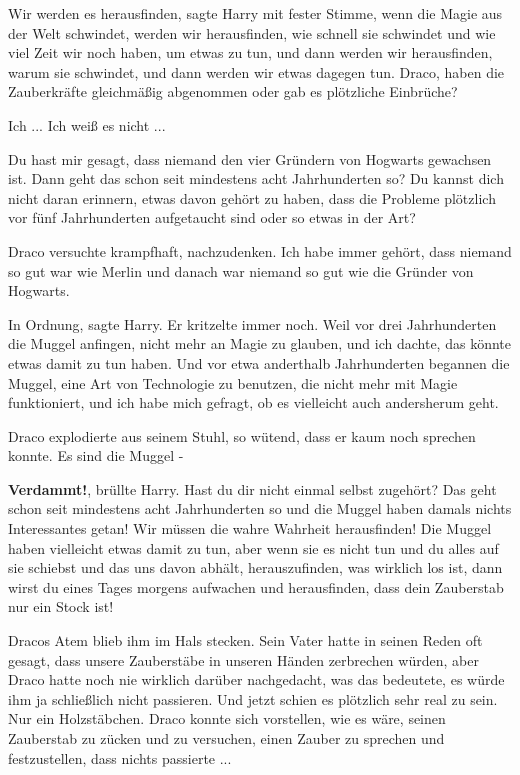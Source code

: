 \glqq{}Wir werden es herausfinden\grqq{}, sagte Harry mit fester Stimme, \glqq{}
wenn die Magie aus der Welt schwindet, werden wir herausfinden, wie schnell sie
schwindet und wie viel Zeit wir noch haben, um etwas zu tun, und dann werden wir
herausfinden, warum sie schwindet, und dann werden wir etwas dagegen tun. Draco,
haben die Zauberkräfte gleichmäßig abgenommen oder gab es plötzliche
Einbrüche?\grqq{}

\glqq{}Ich ... Ich weiß es nicht ...\grqq{}

\glqq{}Du hast mir gesagt, dass niemand den vier Gründern von Hogwarts gewachsen
ist. Dann geht das schon seit mindestens acht Jahrhunderten so? Du kannst dich
nicht daran erinnern, etwas davon gehört zu haben, dass die Probleme plötzlich
vor fünf Jahrhunderten aufgetaucht sind oder so etwas in der Art?\grqq{}

Draco versuchte krampfhaft, nachzudenken. \glqq{}Ich habe immer gehört, dass
niemand so gut war wie Merlin und danach war niemand so gut wie die Gründer von
Hogwarts.\grqq{}

\glqq{}In Ordnung\grqq{}, sagte Harry. Er kritzelte immer noch. \glqq{}Weil vor
drei Jahrhunderten die Muggel anfingen, nicht mehr an Magie zu glauben, und ich
dachte, das könnte etwas damit zu tun haben. Und vor etwa anderthalb
Jahrhunderten begannen die Muggel, eine Art von Technologie zu benutzen, die
nicht mehr mit Magie funktioniert, und ich habe mich gefragt, ob es vielleicht
auch andersherum geht.\grqq{}

Draco explodierte aus seinem Stuhl, so wütend, dass er kaum noch sprechen
konnte. \glqq{}Es sind die Muggel -\grqq{}

\textbf{\glqq{}Verdammt!\grqq{}}, brüllte Harry. \glqq{}Hast du dir nicht einmal
selbst zugehört? Das geht schon seit mindestens acht Jahrhunderten so und die
Muggel haben damals nichts Interessantes getan! Wir müssen die wahre Wahrheit
herausfinden! Die Muggel haben vielleicht etwas damit zu tun, aber wenn sie es
nicht tun und du alles auf sie schiebst und das uns davon abhält,
herauszufinden, was wirklich los ist, dann wirst du eines Tages morgens
aufwachen und herausfinden, dass dein Zauberstab nur ein Stock ist!\grqq{}

Dracos Atem blieb ihm im Hals stecken. Sein Vater hatte in seinen Reden oft
gesagt, dass unsere Zauberstäbe in unseren Händen zerbrechen würden, aber Draco
hatte noch nie wirklich darüber nachgedacht, was das bedeutete, es würde ihm ja
schließlich nicht passieren. Und jetzt schien es plötzlich sehr real zu sein.
Nur ein Holzstäbchen. Draco konnte sich vorstellen, wie es wäre, seinen
Zauberstab zu zücken und zu versuchen, einen Zauber zu sprechen und
festzustellen, dass nichts passierte ...


